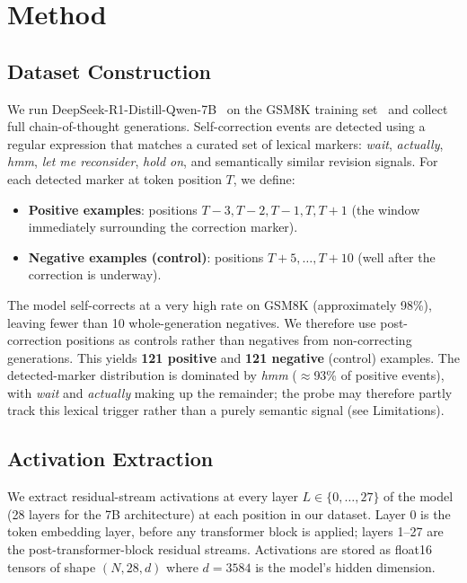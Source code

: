 \documentclass{article}
\begin{document}
\section{Method}
\label{sec:method}

\subsection{Dataset Construction}
\label{sec:data}

We run DeepSeek-R1-Distill-Qwen-7B~\citep{deepseek2025r1} on the GSM8K training set~\citep{cobbe2021gsm8k} and collect full chain-of-thought generations.
Self-correction events are detected using a regular expression that matches a curated set of lexical markers: \textit{wait}, \textit{actually}, \textit{hmm}, \textit{let me reconsider}, \textit{hold on}, and semantically similar revision signals.
For each detected marker at token position $T$, we define:

\begin{itemize}
  \item \textbf{Positive examples}: positions $T - 3, T - 2, T - 1, T, T + 1$ (the window immediately surrounding the correction marker).
  \item \textbf{Negative examples (control)}: positions $T + 5, \ldots, T + 10$ (well after the correction is underway).
\end{itemize}

The model self-corrects at a very high rate on GSM8K (approximately 98\%), leaving fewer than 10 whole-generation negatives.
We therefore use post-correction positions as controls rather than negatives from non-correcting generations.
This yields \textbf{121 positive} and \textbf{121 negative} (control)
examples. The detected-marker distribution is dominated by \textit{hmm}
($\approx$93\% of positive events), with \textit{wait} and \textit{actually}
making up the remainder; the probe may therefore partly track this lexical
trigger rather than a purely semantic signal (see Limitations).

\subsection{Activation Extraction}
\label{sec:activation}

We extract residual-stream activations at every layer $L \in \{0, \ldots, 27\}$ of the model (28 layers for the 7B architecture) at each position in our dataset.
Layer 0 is the token embedding layer, before any transformer block is applied; layers 1--27 are the post-transformer-block residual streams.
Activations are stored as float16 tensors of shape $(N, 28, d)$ where $d = 3584$ is the model's hidden dimension.
\end{document}
